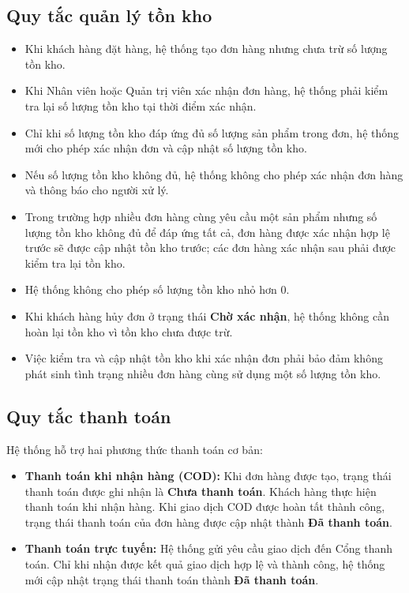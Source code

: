 \documentclass[12pt,a4paper]{article}
\begin{document}
\subsection*{Quy tắc quản lý tồn kho}
\begin{itemize}
    \item Khi khách hàng đặt hàng, hệ thống tạo đơn hàng nhưng chưa trừ số lượng tồn kho.
    \item Khi Nhân viên hoặc Quản trị viên xác nhận đơn hàng, hệ thống phải kiểm tra lại số lượng tồn kho tại thời điểm xác nhận.
    \item Chỉ khi số lượng tồn kho đáp ứng đủ số lượng sản phẩm trong đơn, hệ thống mới cho phép xác nhận đơn và cập nhật số lượng tồn kho.
    \item Nếu số lượng tồn kho không đủ, hệ thống không cho phép xác nhận đơn hàng và thông báo cho người xử lý.
    \item Trong trường hợp nhiều đơn hàng cùng yêu cầu một sản phẩm nhưng số lượng tồn kho không đủ để đáp ứng tất cả, đơn hàng được xác nhận hợp lệ trước sẽ được cập nhật tồn kho trước; các đơn hàng xác nhận sau phải được kiểm tra lại tồn kho.
    \item Hệ thống không cho phép số lượng tồn kho nhỏ hơn 0.
    \item Khi khách hàng hủy đơn ở trạng thái \textbf{Chờ xác nhận}, hệ thống không cần hoàn lại tồn kho vì tồn kho chưa được trừ.
    \item Việc kiểm tra và cập nhật tồn kho khi xác nhận đơn phải bảo đảm không phát sinh tình trạng nhiều đơn hàng cùng sử dụng một số lượng tồn kho.
\end{itemize}

\subsection*{Quy tắc thanh toán}

Hệ thống hỗ trợ hai phương thức thanh toán cơ bản:

\begin{itemize}
    \item \textbf{Thanh toán khi nhận hàng (COD):} Khi đơn hàng được tạo, trạng thái thanh toán được ghi nhận là \textbf{Chưa thanh toán}. Khách hàng thực hiện thanh toán khi nhận hàng. Khi giao dịch COD được hoàn tất thành công, trạng thái thanh toán của đơn hàng được cập nhật thành \textbf{Đã thanh toán}.

    \item \textbf{Thanh toán trực tuyến:} Hệ thống gửi yêu cầu giao dịch đến Cổng thanh toán. Chỉ khi nhận được kết quả giao dịch hợp lệ và thành công, hệ thống mới cập nhật trạng thái thanh toán thành \textbf{Đã thanh toán}.
\end{itemize}
\end{document}
